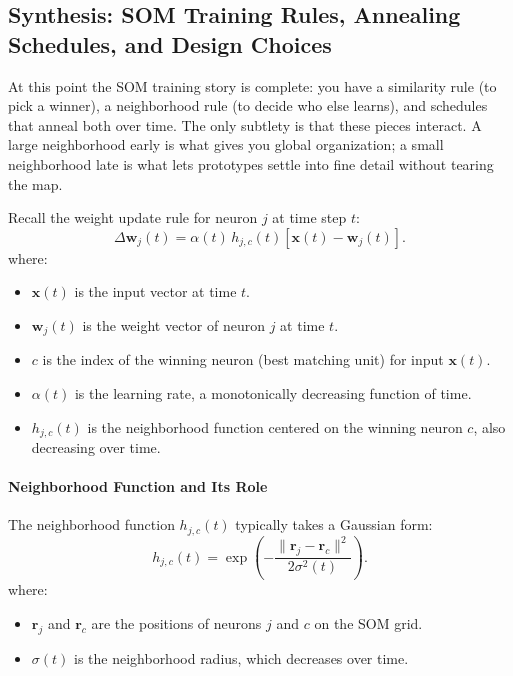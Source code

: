 \subsection{Synthesis: SOM Training Rules, Annealing Schedules, and Design Choices}
\label{sec:som_wrapping_up_the_kohonen_self_organizing_map_som_derivations}

At this point the SOM training story is complete: you have a similarity rule (to pick a winner), a neighborhood rule (to decide who else learns), and schedules that anneal both over time. The only subtlety is that these pieces interact. A large neighborhood early is what gives you global organization; a small neighborhood late is what lets prototypes settle into fine detail without tearing the map.

Recall the weight update rule for neuron \( j \) at time step \( t \):
\[
    \Delta \mathbf{w}_j(t) = \alpha(t) \, h_{j, c}(t) \left[ \mathbf{x}(t) - \mathbf{w}_j(t) \right].
\]
where:
\begin{itemize}
    \item \(\mathbf{x}(t)\) is the input vector at time \( t \).
    \item \(\mathbf{w}_j(t)\) is the weight vector of neuron \( j \) at time \( t \).
    \item \(c\) is the index of the winning neuron (best matching unit) for input \(\mathbf{x}(t)\).
    \item \(\alpha(t)\) is the learning rate, a monotonically decreasing function of time.
    \item \(h_{j, c}(t)\) is the neighborhood function centered on the winning neuron \( c \), also decreasing over time.
\end{itemize}

\paragraph{Neighborhood Function and Its Role}

The neighborhood function \( h_{j, c}(t) \) typically takes a Gaussian form:
\begin{equation}
    h_{j, c}(t) = \exp\left(-\frac{\| \mathbf{r}_j - \mathbf{r}_{c} \|^2}{2\sigma^2(t)}\right).
    \label{eq:neighborhood_function}
\end{equation}
where:
\begin{itemize}
    \item \(\mathbf{r}_j\) and \(\mathbf{r}_{c}\) are the positions of neurons \( j \) and \( c \) on the SOM grid.
    \item \(\sigma(t)\) is the neighborhood radius, which decreases over time.
\end{itemize}

